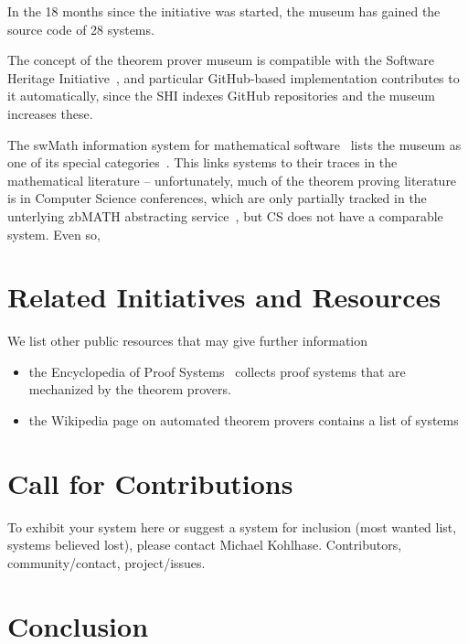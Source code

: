 \documentclass[smallcondensed]{svjour3}
\begin{document}
In the 18 months since the initiative was started, the museum has gained the source code
of 28 systems.

The concept of the theorem prover museum is compatible with the Software Heritage
Initiative~\cite{SoftwareHeritage:on}, and particular GitHub-based implementation
contributes to it automatically, since the SHI indexes GitHub repositories and the museum
increases these.

The \textsf{swMath} information system for mathematical software~\cite{swMath:on} lists
the museum as one of its special categories~\cite{swMath:tpmuseum:on}. This links systems
to their traces in the mathematical literature -- unfortunately, much of the theorem
proving literature is in Computer Science conferences, which are only partially tracked in
the unterlying \textsf{zbMATH} abstracting service~\cite{zbMATH:on}, but CS does not have
a comparable system. Even so, 

\section{Related Initiatives and Resources}
We list other public resources that may give further information
\begin{itemize}
\item the Encyclopedia of Proof Systems~\cite{Wolzenlogel-Paleo:teps17} collects proof
  systems that are mechanized by the theorem provers.
\item the Wikipedia page on automated theorem provers contains a list of systems
\end{itemize}

\section{Call for Contributions}

To exhibit your system here or suggest a system for inclusion (most wanted
list, systems believed lost), please contact Michael Kohlhase. Contributors,
community/contact, project/issues.

\section{Conclusion}\label{sec:concl}

\begin{acknowledgements}
\end{acknowledgements}

\printbibliography
\end{document}
